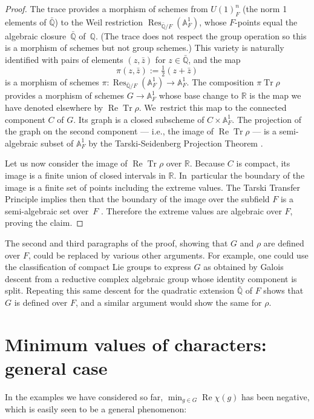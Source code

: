 \documentclass[JEP,XML,SOM,Unicode,NoFloatCountersInSection,published]{cedram}
\theoremstyle{definition}
\let\:\colon
\newcommand{\A}{\mathbb{A}}
\newcommand{\R}{\mathbb{R}}
\newcommand{\Q}{\mathbb{Q}}
\DeclareMathOperator{\RE}{Re}
\renewcommand{\Re}{\RE}
\DeclareMathOperator{\Tr}{Tr}
\DeclareMathOperator{\Res}{Res}
\newcommand{\Qalg}{\bar{\Q}}
\begin{document}
\begin{proof}
The trace provides a morphism of schemes from $U(1)_F^n$ (the norm 1 elements of $\Qalg$) to the Weil restriction $\Res_{\Qalg/F}(\A^1_F)$, whose $F$-points equal the algebraic closure~$\Qalg$ of~$\Q$. (The trace does not respect the group operation so this is a morphism of schemes but not group schemes.) This variety is naturally identified with pairs of elements $(z, \bar{z})$ for $z \in \Qalg$, and the map
\[
\pi(z, \bar{z}) := \tfrac12(z + \bar{z})
\]
is a morphism of schemes $\pi \: \Res_{\Qalg/F}(\A^1_F) \to \A^1_F$. The composition $\pi \Tr \rho$ provides a morphism of schemes $G \to \A^1_F$ whose base change to $\R$ is the map we have denoted elsewhere by $\Re \Tr \rho$. We~restrict this map to the connected component $C$ of $G$. Its graph
is a closed subscheme of $C \times \A^1_F$.
The projection of the graph on the second component --- i.e., the image of $\Re \Tr \rho$ --- is a semi-algebraic subset of $\A^1_F$ by the Tarski-Seidenberg Projection Theorem \cite[Th.\,1.5.8]{Scheiderer}.

Let us now consider the image of $\Re \Tr \rho$ over $\R$. Because $C$ is compact, its image is a finite union of closed intervals in $\R$. In~particular the boundary of the image is a finite set of points including the extreme values. The Tarski Transfer Principle implies then that the boundary of the image over the subfield $F$ is a semi-algebraic set over~$F$ \cite[Cor.\,1.6.18]{Scheiderer}. Therefore the extreme values are algebraic over $F$, proving the claim.
\end{proof}

The second and third paragraphs of the proof, showing that $G$ and $\rho$ are defined over $F$, could be replaced by various other arguments. For example, one could use the classification of compact Lie groups to express $G$ as obtained by Galois descent from a reductive complex algebraic group whose identity component is split. Repeating this same descent for the quadratic extension $\Qalg$ of $F$ shows that $G$ is defined over $F$, and a similar argument would show the same for $\rho$.

\section{Minimum values of characters: general case} \label{general.sec}

In the examples we have considered so far, $\min_{g \in G} \RE \chi(g)$ has been negative, which is easily seen to be a general phenomenon:
\end{document}
